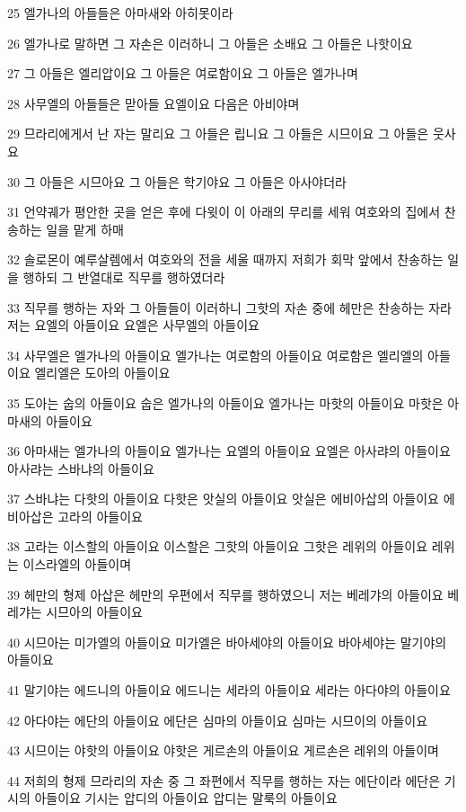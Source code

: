 \par 25 엘가나의 아들들은 아마새와 아히못이라
\par 26 엘가나로 말하면 그 자손은 이러하니 그 아들은 소배요 그 아들은 나핫이요
\par 27 그 아들은 엘리압이요 그 아들은 여로함이요 그 아들은 엘가나며
\par 28 사무엘의 아들들은 맏아들 요엘이요 다음은 아비야며
\par 29 므라리에게서 난 자는 말리요 그 아들은 립니요 그 아들은 시므이요 그 아들은 웃사요
\par 30 그 아들은 시므아요 그 아들은 학기야요 그 아들은 아사야더라
\par 31 언약궤가 평안한 곳을 얻은 후에 다윗이 이 아래의 무리를 세워 여호와의 집에서 찬송하는 일을 맡게 하매
\par 32 솔로몬이 예루살렘에서 여호와의 전을 세울 때까지 저희가 회막 앞에서 찬송하는 일을 행하되 그 반열대로 직무를 행하였더라
\par 33 직무를 행하는 자와 그 아들들이 이러하니 그핫의 자손 중에 헤만은 찬송하는 자라 저는 요엘의 아들이요 요엘은 사무엘의 아들이요
\par 34 사무엘은 엘가나의 아들이요 엘가나는 여로함의 아들이요 여로함은 엘리엘의 아들이요 엘리엘은 도아의 아들이요
\par 35 도아는 숩의 아들이요 숩은 엘가나의 아들이요 엘가나는 마핫의 아들이요 마핫은 아마새의 아들이요
\par 36 아마새는 엘가나의 아들이요 엘가나는 요엘의 아들이요 요엘은 아사랴의 아들이요 아사랴는 스바냐의 아들이요
\par 37 스바냐는 다핫의 아들이요 다핫은 앗실의 아들이요 앗실은 에비아삽의 아들이요 에비아삽은 고라의 아들이요
\par 38 고라는 이스할의 아들이요 이스할은 그핫의 아들이요 그핫은 레위의 아들이요 레위는 이스라엘의 아들이며
\par 39 헤만의 형제 아삽은 헤만의 우편에서 직무를 행하였으니 저는 베레갸의 아들이요 베레갸는 시므아의 아들이요
\par 40 시므아는 미가엘의 아들이요 미가엘은 바아세야의 아들이요 바아세야는 말기야의 아들이요
\par 41 말기야는 에드니의 아들이요 에드니는 세라의 아들이요 세라는 아다야의 아들이요
\par 42 아다야는 에단의 아들이요 에단은 심마의 아들이요 심마는 시므이의 아들이요
\par 43 시므이는 야핫의 아들이요 야핫은 게르손의 아들이요 게르손은 레위의 아들이며
\par 44 저희의 형제 므라리의 자손 중 그 좌편에서 직무를 행하는 자는 에단이라 에단은 기시의 아들이요 기시는 압디의 아들이요 압디는 말룩의 아들이요
